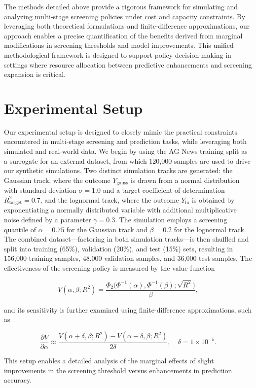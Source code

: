 \documentclass[11pt]{article}
\begin{document}
The methods detailed above provide a rigorous framework for simulating and analyzing multi-stage screening policies under cost and capacity constraints. By leveraging both theoretical formulations and finite-difference approximations, our approach enables a precise quantification of the benefits derived from marginal modifications in screening thresholds and model improvements. This unified methodological framework is designed to support policy decision-making in settings where resource allocation between predictive enhancements and screening expansion is critical.

\section{Experimental Setup}
Our experimental setup is designed to closely mimic the practical constraints encountered in multi-stage screening and prediction tasks, while leveraging both simulated and real-world data. We begin by using the AG News training split as a surrogate for an external dataset, from which 120,000 samples are used to drive our synthetic simulations. Two distinct simulation tracks are generated: the Gaussian track, where the outcome \(Y_{\text{gauss}}\) is drawn from a normal distribution with standard deviation \(\sigma=1.0\) and a target coefficient of determination \(R^2_{\text{target}}=0.7\), and the lognormal track, where the outcome \(Y_{\text{ln}}\) is obtained by exponentiating a normally distributed variable with additional multiplicative noise defined by a parameter \(\gamma=0.3\). The simulation employs a screening quantile of \(\alpha=0.75\) for the Gaussian track and \(\beta=0.2\) for the lognormal track. The combined dataset—factoring in both simulation tracks—is then shuffled and split into training (65\%), validation (20\%), and test (15\%) sets, resulting in 156,000 training samples, 48,000 validation samples, and 36,000 test samples. The effectiveness of the screening policy is measured by the value function

\[
V(\alpha,\beta; R^2)=\frac{\Phi_2\Big(\Phi^{-1}(\alpha),\Phi^{-1}(\beta); \sqrt{R^2}\Big)}{\beta},
\]

and its sensitivity is further examined using finite-difference approximations, such as

\[
\frac{\partial V}{\partial \alpha} \approx \frac{V(\alpha+\delta,\beta; R^2)-V(\alpha-\delta,\beta; R^2)}{2\delta}, \quad \delta=1\times10^{-5}.
\]

This setup enables a detailed analysis of the marginal effects of slight improvements in the screening threshold versus enhancements in prediction accuracy.
\end{document}
